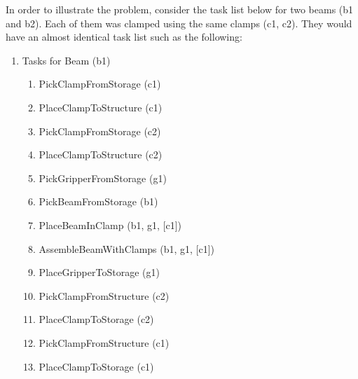 In order to illustrate the problem, consider the task list below for two beams (b1 and b2). Each of them was clamped using the same clamps (c1, c2). They would have an almost identical task list such as the following:

\begin{enumerate}[nosep]

	\item {\footnotesize Tasks for Beam (b1) }
    \begin{enumerate}
        \item {\footnotesize PickClampFromStorage (c1)}
        \item {\footnotesize PlaceClampToStructure (c1)}
        \item {\footnotesize PickClampFromStorage (c2)}
        \item {\footnotesize PlaceClampToStructure (c2)}
        \item {\footnotesize PickGripperFromStorage (g1)}
        \item {\footnotesize PickBeamFromStorage (b1)}
        \item {\footnotesize PlaceBeamInClamp (b1, g1, [c1])}
        \item {\footnotesize AssembleBeamWithClamps (b1, g1, [c1])}
        \item {\footnotesize PlaceGripperToStorage (g1)}
        \item {\footnotesize PickClampFromStructure (c2)}
        \item {\footnotesize PlaceClampToStorage (c2)}
        \item {\footnotesize PickClampFromStructure (c1)}
        \item {\footnotesize PlaceClampToStorage (c1)}
    \end{enumerate}


\end{enumerate}

